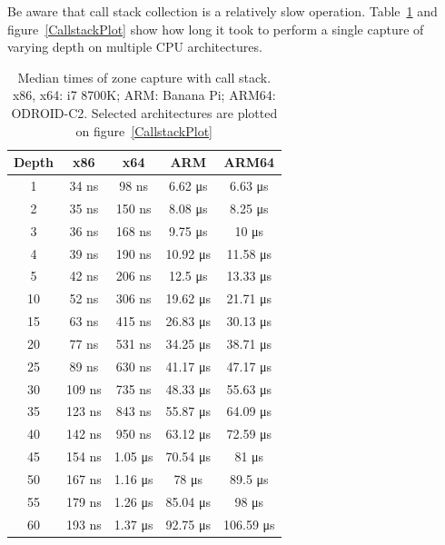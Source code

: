 \documentclass[hidelinks,titlepage,a4paper,twoside]{article}
\begin{document}
Be aware that call stack collection is a relatively slow operation. Table~\ref{CallstackTimes} and figure~\ref{CallstackPlot} show how long it took to perform a single capture of varying depth on multiple CPU architectures.

\begin{table}[h]
\centering
\begin{tabular}[h]{c|c|c|c|c}
\textbf{Depth} & \textbf{x86} & \textbf{x64} & \textbf{ARM} & \textbf{ARM64} \\ \hline
1 & 34 \si{\nano\second} & 98 \si{\nano\second} & 6.62 \si{\micro\second} & 6.63 \si{\micro\second} \\
2 & 35 \si{\nano\second} & 150 \si{\nano\second} & 8.08 \si{\micro\second} & 8.25 \si{\micro\second} \\
3 & 36 \si{\nano\second} & 168 \si{\nano\second} & 9.75 \si{\micro\second} & 10 \si{\micro\second} \\
4 & 39 \si{\nano\second} & 190 \si{\nano\second} & 10.92 \si{\micro\second} & 11.58 \si{\micro\second} \\
5 & 42 \si{\nano\second} & 206 \si{\nano\second} & 12.5 \si{\micro\second} & 13.33 \si{\micro\second} \\
10 & 52 \si{\nano\second} & 306 \si{\nano\second} & 19.62 \si{\micro\second} & 21.71 \si{\micro\second} \\
15 & 63 \si{\nano\second} & 415 \si{\nano\second} & 26.83 \si{\micro\second} & 30.13 \si{\micro\second} \\
20 & 77 \si{\nano\second} & 531 \si{\nano\second} & 34.25 \si{\micro\second} & 38.71 \si{\micro\second} \\
25 & 89 \si{\nano\second} & 630 \si{\nano\second} & 41.17 \si{\micro\second} & 47.17 \si{\micro\second} \\
30 & 109 \si{\nano\second} & 735 \si{\nano\second} & 48.33 \si{\micro\second} & 55.63 \si{\micro\second} \\
35 & 123 \si{\nano\second} & 843 \si{\nano\second} & 55.87 \si{\micro\second} & 64.09 \si{\micro\second} \\
40 & 142 \si{\nano\second} & 950 \si{\nano\second} & 63.12 \si{\micro\second} & 72.59 \si{\micro\second} \\
45 & 154 \si{\nano\second} & 1.05 \si{\micro\second} & 70.54 \si{\micro\second} & 81 \si{\micro\second} \\
50 & 167 \si{\nano\second} & 1.16 \si{\micro\second} & 78 \si{\micro\second} & 89.5 \si{\micro\second} \\
55 & 179 \si{\nano\second} & 1.26 \si{\micro\second} & 85.04 \si{\micro\second} & 98 \si{\micro\second} \\
60 & 193 \si{\nano\second} & 1.37 \si{\micro\second} & 92.75 \si{\micro\second} & 106.59 \si{\micro\second}
\end{tabular}
\caption{Median times of zone capture with call stack. x86, x64: i7 8700K; ARM: Banana Pi; ARM64: ODROID-C2. Selected architectures are plotted on figure~\ref{CallstackPlot}}
\label{CallstackTimes}
\end{table}
\end{document}
